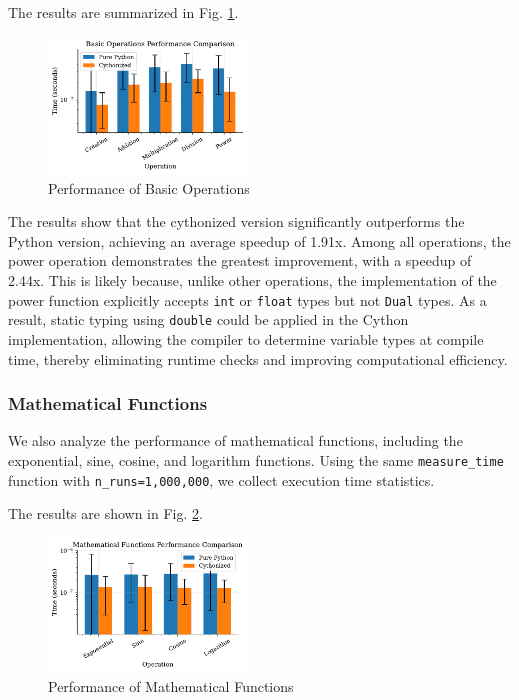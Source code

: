 \documentclass{article}
\begin{document}
The results are summarized in Fig. \ref{fig:bo}.

\begin{figure}[!htbp]
\centering
\includegraphics[width=0.47\textwidth]{./images/basic_ops_performance.pdf}
\caption{Performance of Basic Operations}
\label{fig:bo}
\end{figure}

The results show that the cythonized version significantly outperforms the Python version, achieving an average speedup of 1.91x. Among all operations, the power operation demonstrates the greatest improvement, with a speedup of 2.44x. This is likely because, unlike other operations, the implementation of the power function explicitly accepts \texttt{int} or \texttt{float} types but not \texttt{Dual} types. As a result, static typing using \texttt{double} could be applied in the Cython implementation, allowing the compiler to determine variable types at compile time, thereby eliminating runtime checks and improving computational efficiency.

\subsubsection*{Mathematical Functions}

We also analyze the performance of mathematical functions, including the exponential, sine, cosine, and logarithm functions. Using the same \texttt{measure\_time} function with \texttt{n\_runs=1,000,000}, we collect execution time statistics.

The results are shown in Fig. \ref{fig:mf}.
\newpage
\begin{figure}[!htbp]
\centering
\includegraphics[width=0.47\textwidth]{./images/math_funcs_performance.pdf}
\caption{Performance of Mathematical Functions}
\label{fig:mf}
\end{figure}
\end{document}
